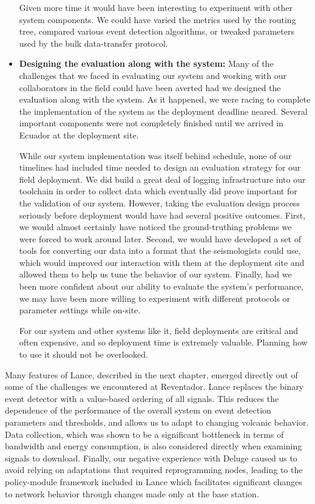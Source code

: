 \begin{itemize}
Given more time it would have been interesting to experiment with other
system components. We could have varied the metrics used by the routing tree,
compared various event detection algorithms, or tweaked parameters used by
the bulk data-transfer protocol.

\item \textbf{Designing the evaluation along with the system:} Many of the
challenges that we faced in evaluating our system and working with our
collaborators in the field could have been averted had we designed the
evaluation along with the system. As it happened, we were racing to complete
the implementation of the system as the deployment deadline neared. Several
important components were not completely finished until we arrived in Ecuador
at the deployment site.

While our system implementation was itself behind schedule, none of our
timelines had included time needed to design an evaluation strategy for our
field deployment. We did build a great deal of logging infrastructure into
our toolchain in order to collect data which eventually did prove important
for the validation of our system. However, taking the evaluation design
process seriously before deployment would have had several positive outcomes.
First, we would almost certainly have noticed the ground-truthing problems we
were forced to work around later. Second, we would have developed a set of
tools for converting our data into a format that the seismologists could use,
which would improved our interaction with them at the deployment site and
allowed them to help us tune the behavior of our system. Finally, had we been
more confident about our ability to evaluate the system's performance, we may
have been more willing to experiment with different protocols or parameter
settings while on-site.

For our system and other systems like it, field deployments are critical and
often expensive, and so deployment time is extremely valuable. Planning how
to use it should not be overlooked.

\end{itemize}

Many features of Lance, described in the next chapter, emerged directly out
of some of the challenges we encountered at Reventador. Lance replaces the
binary event detector with a value-based ordering of all signals. This
reduces the dependence of the performance of the overall system on event
detection parameters and thresholds, and allows us to adapt to changing
volcanic behavior. Data collection, which was shown to be a significant
bottleneck in terms of bandwidth and energy consumption, is also considered
directly when examining signals to download. Finally, our negative experience
with Deluge caused us to avoid relying on adaptations that required
reprogramming nodes, leading to the policy-module framework included in Lance
which facilitates significant changes to network behavior through changes
made only at the base station.
